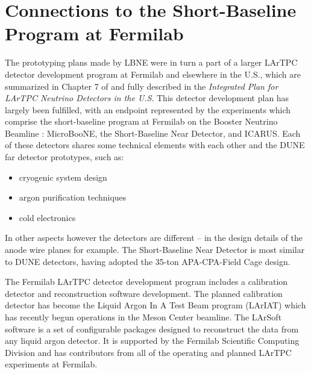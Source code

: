 \section{Connections to the Short-Baseline Program at Fermilab} 
\label{sec:proto-sbn}


The prototyping plans made by LBNE were in turn a part of a larger
LArTPC detector development program at Fermilab and elsewhere in the
U.S., which are summarized in Chapter 7 of \anxlbnefd and fully
described in the \textit{Integrated Plan for LArTPC Neutrino Detectors in the U.S}.
This detector development plan has largely been fulfilled, with an
endpoint represented by the experiments which comprise the
short-baseline program at Fermilab on the Booster Neutrino Beamline :
MicroBooNE, the Short-Baseline Near Detector, and ICARUS.
Each of these detectors shares some technical elements with each other and 
the DUNE far detector prototypes, such as:
\begin{itemize}
\item cryogenic system design
\item argon purification techniques
\item cold electronics
\end{itemize}
In other aspects however the detectors are different -- in the design
details of the anode wire planes for example.  The Short-Baseline Near
Detector is most similar to DUNE detectors, having adopted the 35-ton
APA-CPA-Field Cage design.

The Fermilab LArTPC detector development program includes a
calibration detector and reconstruction software development.  The
planned calibration detector has become the Liquid Argon In A Test
Beam program (LArIAT) which has recently begun operations in the Meson
Center beamline.  The LArSoft software is a set of configurable
packages designed to reconstruct the data from any liquid argon
detector.  It is supported by the Fermilab Scientific Computing
Division and has contributors from all of the operating and planned
LArTPC experiments at Fermilab.
